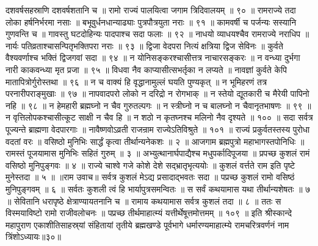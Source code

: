 दशवर्षसहस्राणि दशवर्षशतानि च ॥
रामो राज्यं पालयित्वा जगाम त्रिदिवालयम् ॥ ९० ॥
रामराज्ये तदा लोका हर्षनिर्भरमा नसाः ॥
बभूवुर्धनधान्याढ्याः पुत्रपौत्रयुता नराः ॥ ९१ ॥
कामवर्षी च पर्जन्यः सस्यानि गुणवन्ति च ॥
गावस्तु घटदोहिन्यः पादपाश्च सदा फलाः ॥ ९२ ॥
नाधयो व्याधयश्चैव रामराज्ये नराधिप ॥
नार्यः पतिव्रताश्चासन्पितृभक्तिपरा नराः ॥ ९३ ॥
द्विजा वेदपरा नित्यं क्षत्रिया द्विज सेविनः ॥
कुर्वते वैश्यवर्णाश्च भक्तिं द्विजगवां सदा ॥ ९४ ॥
न योनिसङ्करश्चासीत्तत्र नाचारसङ्करः ॥
न वन्ध्या दुर्भगा नारी काकवन्ध्या मृत प्रजा ॥ ९५ ॥
विधवा नैव काप्यासीत्सभर्तृका न लप्यते ॥
नावज्ञां कुर्वते केपि मातापित्रोर्गुरोस्तथा ॥ ९६ ॥
न च वाक्यं हि वृद्धानामुल्लं घयति पुण्यकृत् ॥
न भूमिहरणं तत्र परनारीपराङ्मुखाः ॥ ९७ ॥
नापवादपरो लोको न दरिद्रो न रोगभाक् ॥
न स्तेयो द्यूतकारी च मैरेयी पापिनो नहि ॥ ९८ ॥
न हेमहारी ब्रह्मघ्नो न चैव गुरुतल्पगः ॥
न स्त्रीघ्नो न च बालघ्नो न चैवानृतभाषणः ॥ ९९ ॥
न वृत्तिलोपकश्चासीत्कूट साक्षी न चैव हि ॥
न शठो न कृतघ्नश्च मलिनो नैव दृश्यते ॥ १०० ॥
सदा सर्वत्र पूज्यन्ते ब्राह्मणा वेदपारगाः ॥
नावैष्णवोऽव्रती राजन्राम राज्येऽतिविश्रुते ॥ १०१ ॥
राज्यं प्रकुर्वतस्तस्य पुरोधा वदतां वरः ॥
वसिष्ठो मुनिभिः सार्द्धं कृत्वा तीर्थान्यनेकशः ॥ २ ॥
आजगाम ब्रह्मपुत्रो महाभागस्तपोनिधिः ॥
रामस्तं पूजयामास मुनिभिः सहितं गुरुम् ॥ ३ ॥
अभ्युत्थानार्घपाद्यैश्च मधुपर्कादिपूजया ॥
प्रपच्छ कुशलं रामं वसिष्ठो मुनिपुङ्गवः ॥ ४ ॥
राज्ये चाश्वे गजे कोशे देशे सद्भ्रातृभृत्ययोः ॥
कुशलं वर्त्तते राम इति पृष्टे मुनेस्तदा ॥ ५ ॥
॥राम उवाच॥
सर्वत्र कुशलं मेऽद्य प्रसादाद्भवतः सदा ॥
पप्रच्छ कुशलं रामो वसिष्ठं मुनिपुङ्गवम् ॥ ६ ॥
सर्वतः कुशली त्वं हि भार्यापुत्रसमन्वितः ॥
स सर्वं कथयामास यथा तीर्थान्यशेषतः ॥ ७ ॥
सेवितानि धरापृष्ठे क्षेत्राण्यायतनानि च ॥
रामाय कथयामास सर्वत्र कुशलं तदा ॥ ८ ॥
ततः स विस्मयाविष्टो रामो राजीवलोचनः ॥
पप्रच्छ तीर्थमाहात्म्यं यत्तीर्थेषूत्तमोत्तमम् ॥ १०९ ॥
इति श्रीस्कान्दे महापुराण एकाशीतिसाहस्र्यां संहितायां तृतीये ब्रह्मखण्डे पूर्वभागे धर्मारण्यमाहात्म्ये रामचरित्रवर्णनं नाम त्रिंशोऽध्यायः॥३०॥



